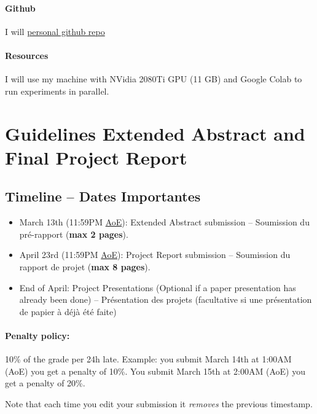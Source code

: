 \documentclass{article}
\begin{document}
\paragraph{Github} I will \href{https://github.com/ivanpuhachov/ift6756}{personal github repo}

\paragraph{Resources} I will use my machine with NVidia 2080Ti GPU (11 GB) and Google Colab to run experiments in parallel.

\section{Guidelines Extended Abstract and Final Project Report}

\subsection{Timeline -- Dates Importantes}
\begin{itemize}
    \item March 13th (11:59PM \href{https://www.timeanddate.com/time/zones/aoe}{AoE}): Extended Abstract submission -- Soumission du pré-rapport (\textbf{max 2 pages}).
    \item April 23rd (11:59PM \href{https://www.timeanddate.com/time/zones/aoe}{AoE}): Project Report submission -- Soumission du rapport de projet (\textbf{max 8 pages}).
    \item End of April: Project Presentations (Optional if a paper presentation has already been done) -- Présentation des projets (facultative si une présentation de papier à déjà été faite)
\end{itemize}

\paragraph{Penalty policy:} 10\% of the grade per 24h late. Example: you submit March 14th at 1:00AM (AoE) you get a penalty of 10\%. You submit March 15th at 2:00AM (AoE) you get a penalty of 20\%.

Note that each time you edit your submission it \emph{removes} the previous timestamp. 
\end{document}
